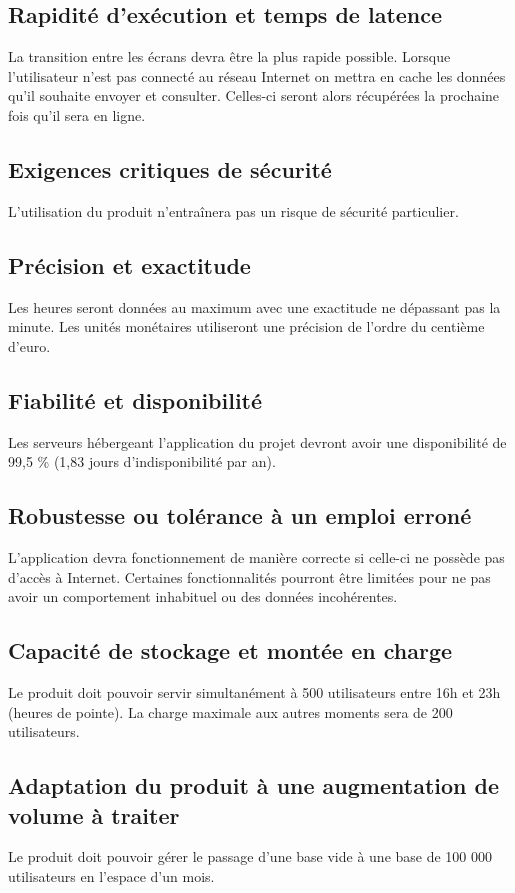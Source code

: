 \subsection{Rapidité d'exécution et temps de latence}
La transition entre les écrans devra être la plus rapide possible. Lorsque l'utilisateur n'est pas connecté au réseau Internet on mettra en cache les données qu'il souhaite envoyer et consulter. Celles-ci seront alors récupérées la prochaine fois qu'il sera en ligne.

\subsection{Exigences critiques de sécurité}
L'utilisation du produit n’entraînera pas un risque de sécurité particulier.

\subsection{Précision et exactitude}
Les heures seront données au maximum avec une exactitude ne dépassant pas la minute. Les unités monétaires utiliseront une précision de l'ordre du centième d'euro.

\subsection{Fiabilité et disponibilité}
Les serveurs hébergeant l'application du projet devront avoir une disponibilité de 99,5 \% (1,83 jours d'indisponibilité par an).

\subsection{Robustesse ou tolérance à un emploi erroné}
L'application devra fonctionnement de manière correcte si celle-ci ne possède pas d'accès à Internet. Certaines fonctionnalités pourront être limitées pour ne pas avoir un comportement inhabituel ou des données incohérentes.

\subsection{Capacité de stockage et montée en charge}
Le produit doit pouvoir servir simultanément à 500 utilisateurs entre 16h et 23h (heures de pointe). La charge maximale aux autres moments sera de 200 utilisateurs.

\subsection{Adaptation du produit à une augmentation de volume à traiter}
Le produit doit pouvoir gérer le passage d'une base vide à une base de 100 000 utilisateurs en l'espace d'un mois.

